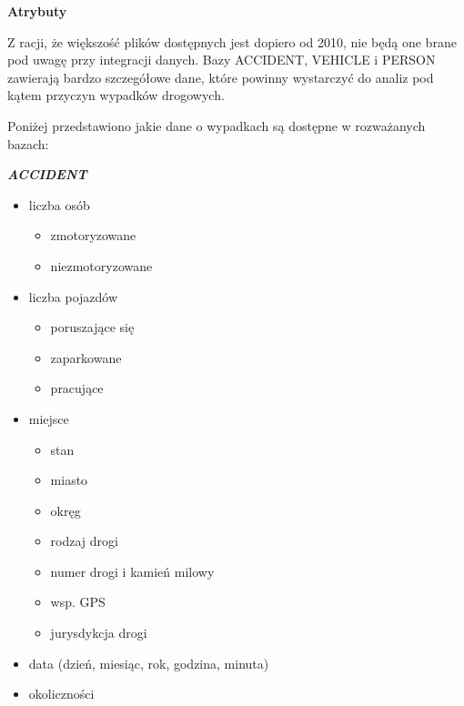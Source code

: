 \textbf{Atrybuty}

Z racji, że większość plików dostępnych jest dopiero od 2010, nie będą
one brane pod uwagę przy integracji danych. Bazy ACCIDENT, VEHICLE i
PERSON zawierają bardzo szczegółowe dane, które powinny wystarczyć do
analiz pod kątem przyczyn wypadków drogowych.

Poniżej przedstawiono jakie dane o wypadkach są dostępne w rozważanych
bazach:

\emph{\textbf{ACCIDENT}}

\begin{itemize}
\item
  liczba osób

  \begin{itemize}
  \itemsep1pt\parskip0pt
  \item
    zmotoryzowane\\
  \item
    niezmotoryzowane\\
  \end{itemize}
\item
  liczba pojazdów

  \begin{itemize}
  \itemsep1pt\parskip0pt
  \item
    poruszające się\\
  \item
    zaparkowane\\
  \item
    pracujące\\
  \end{itemize}
\item
  miejsce

  \begin{itemize}
  \itemsep1pt\parskip0pt
  \item
    stan\\
  \item
    miasto\\
  \item
    okręg\\
  \item
    rodzaj drogi\\
  \item
    numer drogi i kamień milowy\\
  \item
    wsp. GPS\\
  \item
    jurysdykcja drogi\\
  \end{itemize}
\item
  data (dzień, miesiąc, rok, godzina, minuta)\\
\item
  okoliczności


\end{itemize}
